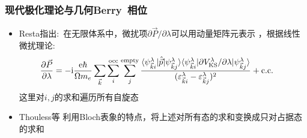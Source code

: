 {\frame
{
	\frametitle{现代极化理论与几何\textrm{Berry~}相位}
	\begin{itemize}
		\item \textrm{Resta}指出:~在无限体系中，微扰项$\partial\vec P/\partial\lambda$可以用动量矩阵元表示%
，根据线性微扰理论:
	\begin{displaymath}
		\hspace*{-15pt}
		\frac{\partial\vec P}{\partial\lambda}=-\mathrm{i}\frac{\mathrm{e}\hbar}{\Omega m_e}\sum_{\vec k}\sum_i^{\mathrm{occ}}\sum_j^{\mathrm{empty}}\frac{\langle\psi_{\vec k i}^{\lambda}|\hat{\vec p}|\psi_{\vec k j}^{\lambda}\rangle\langle\psi_{\vec k i}^{\lambda}|\partial V_{\mathrm{KS}}^{\lambda}/\partial\lambda|\psi_{\vec k j}^{\lambda}\rangle}{(\varepsilon_{\vec k i}^{\lambda}-\varepsilon_{\vec k j}^{\lambda})^2}+\mathrm{c.c.}
	\end{displaymath}
	这里对$i,j$的求和遍历所有自旋态
	\vskip 5pt 
	\item \textrm{Thouless}等%
		利用\textrm{Bloch}表象的特点，将上述对所有态的求和变换成只对占据态的求和%
	\vskip 3pt 
	{\fontsize{8.0pt}{6.2pt}}
	\end{itemize}
}

}
